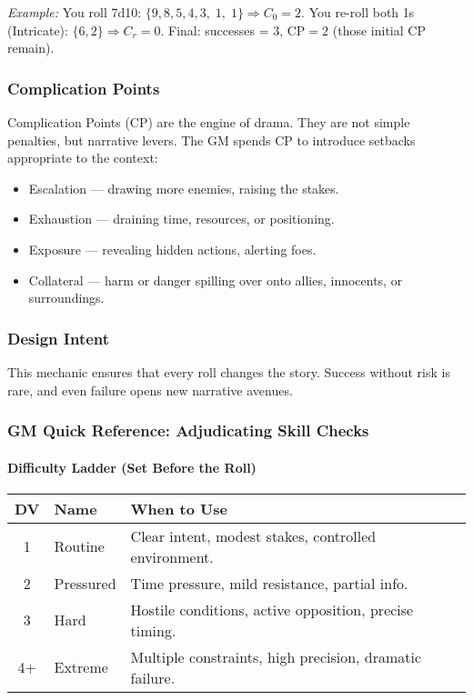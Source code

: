 \documentclass[11pt]{article}
\begin{document}
\textit{Example:} You roll 7d10: \(\{9,8,5,4,3,\;1,\;1\}\Rightarrow C_{0}=2\).
You re-roll both 1s (Intricate): \(\{6,2\}\Rightarrow C_{r}=0\).
Final: successes = 3, \(\text{CP}=2\) (those initial CP remain).

\subsubsection{Complication Points}
Complication Points (CP) are the engine of drama. They are not simple penalties, but narrative levers. The GM spends CP to introduce setbacks appropriate to the context:
\begin{itemize}
    \item Escalation — drawing more enemies, raising the stakes.
    \item Exhaustion — draining time, resources, or positioning.
    \item Exposure — revealing hidden actions, alerting foes.
    \item Collateral — harm or danger spilling over onto allies, innocents, or surroundings.
\end{itemize}

\subsubsection{Design Intent}
This mechanic ensures that every roll changes the story. Success without risk is rare, and even failure opens new narrative avenues.

\subsubsection{GM Quick Reference: Adjudicating Skill Checks}

\paragraph{Difficulty Ladder (Set Before the Roll)}
\begin{center}
\begin{tabular}{cll}
\toprule
\textbf{DV} & \textbf{Name} & \textbf{When to Use} \\
\midrule
1 & Routine & Clear intent, modest stakes, controlled environment. \\
2 & Pressured & Time pressure, mild resistance, partial info. \\
3 & Hard & Hostile conditions, active opposition, precise timing. \\
4+ & Extreme & Multiple constraints, high precision, dramatic failure. \\
\bottomrule
\end{tabular}
\end{center}
\end{document}
